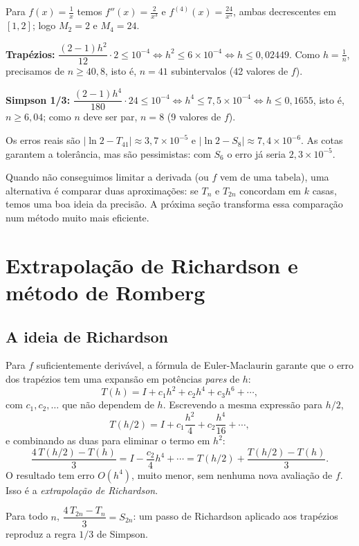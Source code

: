 \begin{exemplo}[: escolha de $n$ para $\int_1^2\frac{dx}{x}=\ln2$ com erro menor que $10^{-4}$]
Para $f(x)=\frac1x$ temos $f''(x)=\frac{2}{x^3}$ e $f^{(4)}(x)=\frac{24}{x^5}$, ambas
decrescentes em $[1,2]$; logo $M_2=2$ e $M_4=24$.

\textbf{Trapézios:}
$\dfrac{(2-1)h^2}{12}\cdot2\le10^{-4}\iff h^2\le6\times10^{-4}\iff h\le0{,}02449$. Como
$h=\frac1n$, precisamos de $n\ge40{,}8$, isto é, $n=41$ subintervalos (42 valores de $f$).

\textbf{Simpson 1/3:}
$\dfrac{(2-1)h^4}{180}\cdot24\le10^{-4}\iff h^4\le7{,}5\times10^{-4}\iff h\le0{,}1655$, isto é,
$n\ge6{,}04$; como $n$ deve ser par, $n=8$ (9 valores de $f$).

Os erros reais são $|\ln2-T_{41}|\approx3{,}7\times10^{-5}$ e
$|\ln2-S_8|\approx7{,}4\times10^{-6}$. As cotas garantem a tolerância, mas são pessimistas:
com $S_6$ o erro já seria $2{,}3\times10^{-5}$.
\end{exemplo}

Quando não conseguimos limitar a derivada (ou $f$ vem de uma tabela), uma alternativa é
comparar duas aproximações: se $T_n$ e $T_{2n}$ concordam em $k$ casas, temos uma boa ideia
da precisão. A próxima seção transforma essa comparação num método muito mais eficiente.

\section{Extrapolação de Richardson e método de Romberg}

\subsection{A ideia de Richardson}

Para $f$ suficientemente derivável, a fórmula de Euler-Maclaurin garante que o erro dos
trapézios tem uma expansão em potências \emph{pares} de $h$:
\[
T(h)=I+c_1h^2+c_2h^4+c_3h^6+\cdots,
\]
com $c_1,c_2,\dots$ que não dependem de $h$. Escrevendo a mesma expressão para $h/2$,
\[
T(h/2)=I+c_1\frac{h^2}{4}+c_2\frac{h^4}{16}+\cdots,
\]
e combinando as duas para eliminar o termo em $h^2$:
\[
\frac{4\,T(h/2)-T(h)}{3}=I-\frac{c_2}{4}h^4+\cdots=T(h/2)+\frac{T(h/2)-T(h)}{3}.
\]
O resultado tem erro $O(h^4)$, muito menor, sem nenhuma nova avaliação de $f$. Isso é a
\emph{extrapolação de Richardson}.

\begin{proposicao}\label{prop:richardson}
Para todo $n$, $\dfrac{4\,T_{2n}-T_n}{3}=S_{2n}$: um passo de Richardson aplicado aos
trapézios reproduz a regra $1/3$ de Simpson.
\end{proposicao}

